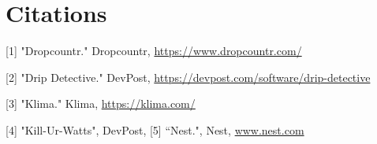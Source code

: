 \documentclass[10pt]{article}
\begin{document}
\section{Citations}
[1] "Dropcountr." Dropcountr, \href{https://www.dropcountr.com/}{https://www.dropcountr.com/}

[2] "Drip Detective." DevPost, \href{https://devpost.com/software/drip-detective}{https://devpost.com/software/drip-detective}

[3] "Klima." Klima, \href{https://klima.com/}{https://klima.com/}

[4] "Kill-Ur-Watts", DevPost, \href{https://appsforenergy.devpost.com/submission}

[5] “Nest.", Nest, \href{http://www.nest.com}{www.nest.com}
\end{document}

